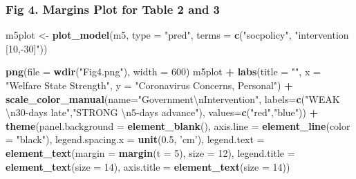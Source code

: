 \documentclass[
]{article}
\newenvironment{Shaded}{\begin{snugshade}}{\end{snugshade}}
\newcommand{\CharTok}[1]{\textcolor[rgb]{0.31,0.60,0.02}{#1}}
\newcommand{\DataTypeTok}[1]{\textcolor[rgb]{0.13,0.29,0.53}{#1}}
\newcommand{\DecValTok}[1]{\textcolor[rgb]{0.00,0.00,0.81}{#1}}
\newcommand{\FloatTok}[1]{\textcolor[rgb]{0.00,0.00,0.81}{#1}}
\newcommand{\KeywordTok}[1]{\textcolor[rgb]{0.13,0.29,0.53}{\textbf{#1}}}
\newcommand{\NormalTok}[1]{#1}
\newcommand{\OperatorTok}[1]{\textcolor[rgb]{0.81,0.36,0.00}{\textbf{#1}}}
\newcommand{\StringTok}[1]{\textcolor[rgb]{0.31,0.60,0.02}{#1}}
\begin{document}
\hypertarget{fig-4.-margins-plot-for-table-2-and-3}{%
\subsubsection{Fig 4. Margins Plot for Table 2 and
3}\label{fig-4.-margins-plot-for-table-2-and-3}}

\begin{Shaded}
\begin{Highlighting}[]
\NormalTok{m5plot <-}\StringTok{ }\KeywordTok{plot_model}\NormalTok{(m5, }\DataTypeTok{type =} \StringTok{"pred"}\NormalTok{, }\DataTypeTok{terms =} \KeywordTok{c}\NormalTok{(}\StringTok{"socpolicy"}\NormalTok{, }\StringTok{"intervention [10,-30]"}\NormalTok{)) }

\KeywordTok{png}\NormalTok{(}\DataTypeTok{file =} \KeywordTok{wdir}\NormalTok{(}\StringTok{"Fig4.png"}\NormalTok{), }\DataTypeTok{width =} \DecValTok{600}\NormalTok{)}
\NormalTok{m5plot }\OperatorTok{+}\StringTok{ }\KeywordTok{labs}\NormalTok{(}\DataTypeTok{title =} \StringTok{""}\NormalTok{, }\DataTypeTok{x =} \StringTok{"Welfare State Strength"}\NormalTok{, }\DataTypeTok{y =} \StringTok{"Coronavirus Concerns, Personal"}\NormalTok{) }\OperatorTok{+}
\StringTok{  }\KeywordTok{scale_color_manual}\NormalTok{(}\DataTypeTok{name=}\StringTok{"Government}\CharTok{\textbackslash{}n}\StringTok{Intervention"}\NormalTok{,}
                       \DataTypeTok{labels=}\KeywordTok{c}\NormalTok{(}\StringTok{"WEAK }\CharTok{\textbackslash{}n}\StringTok{30-days late"}\NormalTok{,}\StringTok{"STRONG }\CharTok{\textbackslash{}n}\StringTok{5-days advance"}\NormalTok{),}
                       \DataTypeTok{values=}\KeywordTok{c}\NormalTok{(}\StringTok{"red"}\NormalTok{,}\StringTok{"blue"}\NormalTok{)) }\OperatorTok{+}
\StringTok{    }\KeywordTok{theme}\NormalTok{(}\DataTypeTok{panel.background =} \KeywordTok{element_blank}\NormalTok{(),}
          \DataTypeTok{axis.line =} \KeywordTok{element_line}\NormalTok{(}\DataTypeTok{color =} \StringTok{"black"}\NormalTok{),}
          \DataTypeTok{legend.spacing.x =} \KeywordTok{unit}\NormalTok{(}\FloatTok{0.5}\NormalTok{, }\StringTok{'cm'}\NormalTok{),}
          \DataTypeTok{legend.text =} \KeywordTok{element_text}\NormalTok{(}\DataTypeTok{margin =} \KeywordTok{margin}\NormalTok{(}\DataTypeTok{t =} \DecValTok{5}\NormalTok{), }\DataTypeTok{size =} \DecValTok{12}\NormalTok{),}
          \DataTypeTok{legend.title =} \KeywordTok{element_text}\NormalTok{(}\DataTypeTok{size =} \DecValTok{14}\NormalTok{),}
          \DataTypeTok{axis.title =} \KeywordTok{element_text}\NormalTok{(}\DataTypeTok{size =} \DecValTok{14}\NormalTok{))}
\end{Highlighting}
\end{Shaded}
\end{document}
